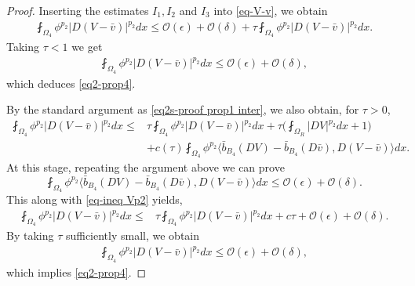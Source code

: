 \documentclass[a4paper,10pt]{amsart}
\newcommand{\Om}{\Omega}
\begin{document}
\begin{proof}
Inserting the estimates $I_1, I_2$ and $I_3$ into 
\eqref{eq-V-v}, we obtain
$$
\begin{aligned}
\fint_{\Om_{4}}\phi^{p_2}|D(V-\bar{v})|^{p_2}dx\leq \mathcal{O}(\epsilon)+\mathcal{O}(\delta)+\tau \fint_{\Om_{4}}\phi^{p_2}|D(V-\bar{v})|^{p_2}dx.
\end{aligned}
$$
Taking $\tau<1$ we get
$$
\begin{aligned}
\fint_{\Om_{4}}\phi^{p_2}|D(V-\bar{v})|^{p_2}dx\leq \mathcal{O}(\epsilon)+\mathcal{O}(\delta),
\end{aligned}
$$
which deduces \eqref{eq2-prop4}.


\bigskip

 By the standard argument as \eqref{eq2s-proof prop1 inter}, we also obtain, for $\tau>0$, 
$$
\begin{aligned}
\fint_{\Om_{4}}\phi^{p_2}|D(V-\bar{v})|^{p_2}dx\leq&  \tau\fint_{\Om_{4}}\phi^{p_2}|D(V-\bar{v})|^{p_2}dx +\tau \Big(\fint_{\Om_{R}}|DV|^{p_2}dx+1\Big)\\
& + c(\tau)\fint_{\Om_{4}}\phi^{p_2} \langle \bar{b}_{B_4}(DV)-\bar{b}_{B_4}(D{\bar{v}}),D(V-\bar{v})\rangle dx.
\end{aligned}
$$
At this stage, repeating the argument above we can prove
$$
\fint_{\Om_{4}}\phi^{p_2} \langle \bar{b}_{B_4}(DV)-\bar{b}_{B_4}(D{\bar{v}}),D(V-\bar{v})\rangle dx\leq \mathcal{O}(\epsilon)+\mathcal{O}(\delta).
$$
This along with \eqref{eq-ineq Vp2} yields,
$$
\begin{aligned}
\fint_{\Om_{4}}\phi^{p_2}|D(V-\bar{v})|^{p_2}dx\leq&  \tau\fint_{\Om_{4}}\phi^{p_2}|D(V-\bar{v})|^{p_2}dx +c\tau+\mathcal{O}(\epsilon)+\mathcal{O}(\delta).
\end{aligned}
$$
By taking $\tau$ sufficiently small, we obtain
$$
\begin{aligned}
\fint_{\Om_{4}}\phi^{p_2}|D(V-\bar{v})|^{p_2}dx\leq \mathcal{O}(\epsilon)+\mathcal{O}(\delta),
\end{aligned}
$$
which implies \eqref{eq2-prop4}.
\end{proof}
\end{document}
